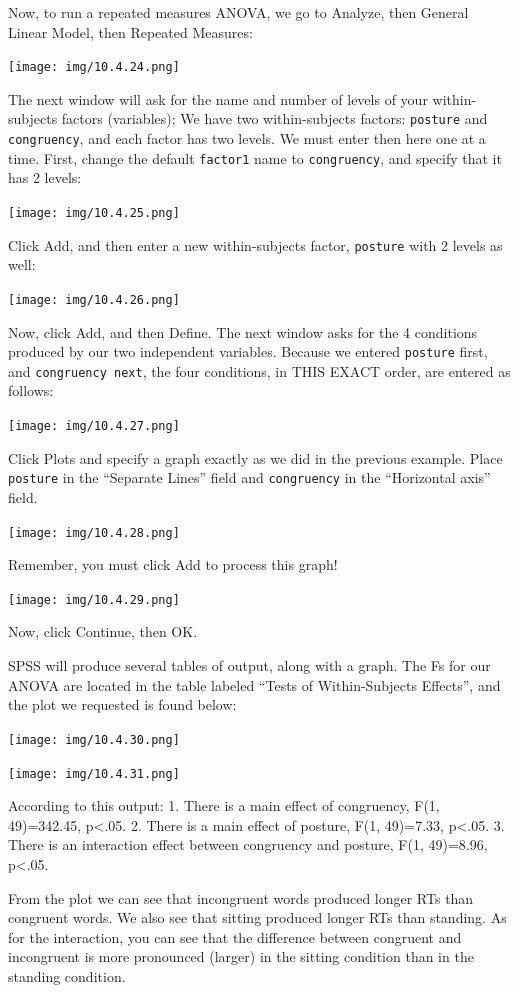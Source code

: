 \documentclass[
]{book}
\begin{document}
Now, to run a repeated measures ANOVA, we go to {Analyze}, then {General Linear Model}, then {Repeated Measures}:

\texttt{[image: img/10.4.24.png]}

The next window will ask for the name and number of levels of your within-subjects factors (variables); We have two within-subjects factors: \texttt{posture} and \texttt{congruency}, and each factor has two levels. We must enter then here one at a time. First, change the default \texttt{factor1} name to \texttt{congruency}, and specify that it has 2 levels:

\texttt{[image: img/10.4.25.png]}

Click {Add}, and then enter a new within-subjects factor, \texttt{posture} with 2 levels as well:

\texttt{[image: img/10.4.26.png]}

Now, click {Add}, and then Define. The next window asks for the 4 conditions produced by our two independent variables. Because we entered \texttt{posture} first, and \texttt{congruency\ next}, the four conditions, in THIS EXACT order, are entered as follows:

\texttt{[image: img/10.4.27.png]}

Click {Plots} and specify a graph exactly as we did in the previous example. Place \texttt{posture} in the ``Separate Lines'' field and \texttt{congruency} in the ``Horizontal axis'' field.

\texttt{[image: img/10.4.28.png]}

Remember, you must click {Add} to process this graph!

\texttt{[image: img/10.4.29.png]}

Now, click {Continue}, then {OK}.

SPSS will produce several tables of output, along with a graph. The Fs for our ANOVA are located in the table labeled ``Tests of Within-Subjects Effects'', and the plot we requested is found below:

\texttt{[image: img/10.4.30.png]}

\texttt{[image: img/10.4.31.png]}

According to this output:
1. There is a main effect of congruency, F(1, 49)=342.45, p\textless.05.
2. There is a main effect of posture, F(1, 49)=7.33, p\textless.05.
3. There is an interaction effect between congruency and posture, F(1, 49)=8.96, p\textless.05.

From the plot we can see that incongruent words produced longer RTs than congruent words. We also see that sitting produced longer RTs than standing. As for the interaction, you can see that the difference between congruent and incongruent is more pronounced (larger) in the sitting condition than in the standing condition.
\end{document}
